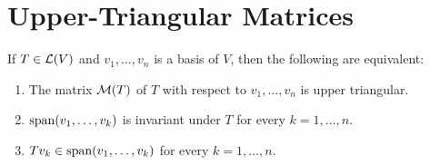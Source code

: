 \section{Upper-Triangular Matrices}

\setcounter{thm}{38}
\begin{thm} 
  \label{thm: conditions for upper-triangular matrix}
  If $T \in \mathcal{L} (V)$ and $v_1, \dots, v_n$ is a basis of $V$, then the following are equivalent:
  \begin{enumerate}[label=\textbf{(\alph*)}]
    \item The matrix $\mathcal{M}(T)$ of $T$ with respect to $v_1, \dots, v_n$ is upper triangular.
    \item $\operatorname{span} (v_1, \dots, v_k)$ is invariant under $T$ for every $k =  1, \dots, n$.
    \item $T v_k \in \operatorname{span} (v_1, \dots, v_k)$ for every $k =1, \dots, n$.
  \end{enumerate}
\end{thm}
